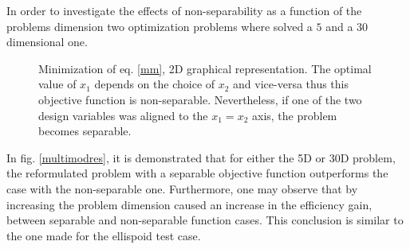 In order to investigate the effects of non-separability as a function of the problems dimension two optimization problems where solved a $5$ and a $30$ dimensional one.  
\begin{figure}[h!]
\begin{minipage}[b]{1\linewidth}
 \centering
\end{minipage}
\caption{Minimization of eq. \ref{mm}, 2D graphical representation. The optimal value of $x_1$  depends on the choice of $x_2$ and vice-versa thus this objective function is non-separable. Nevertheless, if one of the two design variables was aligned to the $x_1=x_2$ axis, the problem becomes separable.} 

\label{multimod}
\end{figure}

In fig. \ref{multimodres}, it is demonstrated that for either the 5D or 30D problem, the reformulated problem with a separable objective function outperforms the case with the non-separable one. Furthermore, one may observe that by increasing the problem dimension caused an increase in the efficiency gain, between separable and non-separable function cases. This conclusion is similar to the one made for the ellispoid test case. 



